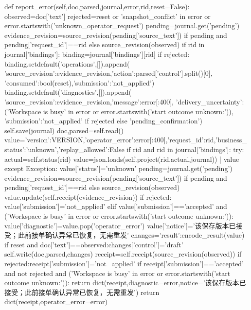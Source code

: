     def report_error(self,doc,parsed,journal,error,rid,reset=False):
        observed=doc['text']
        rejected=reset or 'snapshot_conflict' in error or error.startswith('unknown_operator_request')
        pending=journal.get('pending')
        evidence_revision=source_revision(pending['source_text']) if pending and pending['request_id']==rid else source_revision(observed)
        if rid in journal['bindings']:
            binding=journal['bindings'][rid]
            if rejected:
                binding.setdefault('operations',[]).append({
                    'source_revision':evidence_revision,'action':parsed['control'].split()[0],
                    'consumed':bool(reset),'submission':'not_applied'})
            binding.setdefault('diagnostics',[]).append({
                'source_revision':evidence_revision,'message':error[:400],
                'delivery_uncertainty':('Workspace is busy' in error or error.startswith('start outcome unknown:')),
                'submission':'not_applied' if rejected else 'pending_confirmation'})
            self.save(journal)
        doc,parsed=self.read()
        value={'version':VERSION,'operator_error':error[:400],'request_id':rid,'business_status':'unknown','replay_allowed':False}
        if rid and rid in journal['bindings']:
            try:
                actual=self.status(rid)
                value=json.loads(self.project(rid,actual,journal)) | value
            except Exception:
                value['status']='unknown'
        pending=journal.get('pending')
        evidence_revision=source_revision(pending['source_text']) if pending and pending['request_id']==rid else source_revision(observed)
        value.update(self.receipt(evidence_revision))
        if rejected:
            value['submission']='not_applied'
        elif value['submission']=='accepted' and ('Workspace is busy' in error or error.startswith('start outcome unknown:')):
            value['diagnostic']=value.pop('operator_error')
            value['notice']='该保存版本已接受；此前接单确认异常已恢复，无需重发'
        changes={'result':encode_result(value)}
        if reset and doc['text']==observed:changes['control']='draft\n'
        self.write(doc,parsed,changes)
        receipt=self.receipt(source_revision(observed))
        if rejected:receipt['submission']='not_applied'
        if receipt['submission']=='accepted' and not rejected and ('Workspace is busy' in error or error.startswith('start outcome unknown:')):
            return dict(receipt,diagnostic=error,notice='该保存版本已接受；此前接单确认异常已恢复，无需重发')
        return dict(receipt,operator_error=error)

